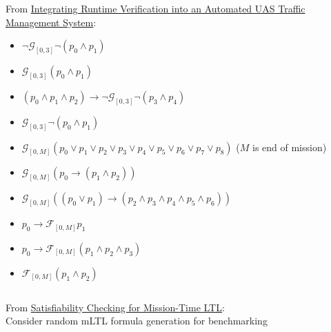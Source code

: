 \documentclass{article}
\newcommand{\FF}{\mathcal{F}}
\newcommand{\GG}{\mathcal{G}}
\begin{document}
From \href{https://link.springer.com/chapter/10.1007/978-3-030-59155-7_26}{Integrating Runtime Verification into an Automated UAS Traffic Management System}:
\begin{itemize}
    \item $\neg \GG_{[0,3]} \neg (p_0 \land p_1)$
    \item $\GG_{[0,3]} (p_0 \land p_1)$
    \item $(p_0 \land p_1 \land p_2) \rightarrow \neg \GG_{[0,3]}\neg(p_3 \land p_4)$
    \item $\GG_{[0,3]} \neg(p_0 \land p_1)$
    \item $\GG_{[0, M]} (p_0 \lor p_1 \lor p_2 \lor p_3 \lor p_4 \lor p_5 \lor p_6 \lor p_7 \lor p_8)$ ($M$ is end of mission)
    \item $\GG_{[0, M]}(p_0 \rightarrow (p_1 \land p_2))$
    \item $\GG_{[0,M]}((p_0 \lor p_1) \rightarrow (p_2 \land p_3 \land p_4 \land p_5 \land p_6))$
    \item $p_0 \rightarrow \FF_{[0,M]} p_1$
    \item $p_0 \rightarrow \FF_{[0,M]} (p_1 \land p_2 \land p_3)$
    \item $\FF_{[0,M]} (p_1 \land p_2)$
\end{itemize}
$$$$

From \href{https://link.springer.com/chapter/10.1007/978-3-030-25543-5_1}{
Satisfiability Checking for Mission-Time LTL}:\\
\indent Consider random mLTL formula generation for benchmarking\\
\end{document}
